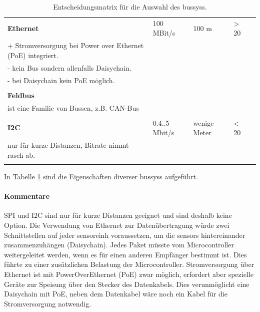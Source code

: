 \begin{table}
\begin{tabular}{|l|l|l|l|l|}
\begin{minipage}{6cm}
\end{minipage} \\ 
\hline \textbf{Ethernet} & 100 MBit/s & 100 m & > 20 & \begin{minipage}{6cm}
\mbox{ }\\+ Stromversorgung bei Power over Ethernet (PoE) integriert.\\
- kein Bus sondern allenfalls Daisychain.\\
- bei Daisychain kein PoE möglich.\\
\end{minipage} \\ 
\hline \textbf{Feldbus} &  &  &  & \begin{minipage}{6cm}
\mbox{ }\\ist eine Familie von Bussen, z.B. CAN-Bus\\
\end{minipage} \\ 
\hline \textbf{I2C} & 0.4..5 Mbit/s & wenige Meter & < 20 & \begin{minipage}{6cm}
\mbox{ }\\nur für kurze Distanzen, Bitrate nimmt rasch ab.\\
\end{minipage}\\
\hline 
\end{tabular}
\caption{Entscheidungsmatrix für die Auswahl des \gls{bussys}s.}
\label{table.bussystem}
\end{table} 

In Tabelle \ref{table.bussystem} sind die Eigenschaften diverser \glspl{bussys} aufgeführt.

\paragraph{Kommentare}
SPI und I2C sind nur für kurze Distanzen geeignet und sind deshalb keine Option.
Die Verwendung von Ethernet zur Datenübertragung würde zwei Schnittstellen auf jeder \gls{sensoreinh} voraussetzen, um die \glspl{sensor} hintereinander zusammenzuhängen (Daisychain). Jedes Paket müsste vom Microcontroller weitergeleitet werden, wenn es für einen anderen Empfänger bestimmt ist. Dies führte zu einer zusätzlichen Belastung der Microcontroller. Stromversorgung über Ethernet ist mit PowerOverEthernet (PoE) zwar möglich, erfordert aber spezielle Geräte zur Speisung über den Stecker des Datenkabels. Dies verunmöglicht eine Daisychain mit PoE, neben dem Datenkabel wäre noch ein Kabel für die Stromversorgung notwendig.

